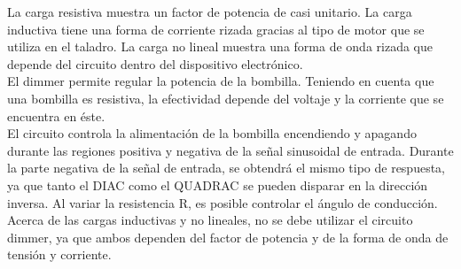 \documentclass[journal]{IEEEtran}
\begin{document}





La carga resistiva muestra un factor de potencia de 
casi unitario. La carga inductiva tiene una forma de 
corriente rizada gracias al tipo de motor que se 
utiliza en el taladro. La carga no lineal muestra 
una forma de onda rizada que depende del circuito 
dentro del dispositivo electrónico. \\

El dimmer permite regular la potencia de la bombilla. 
Teniendo en cuenta que una bombilla es resistiva, la 
efectividad depende del voltaje y la corriente que se 
encuentra en éste. \\

El circuito controla la alimentación de la bombilla 
encendiendo y apagando durante las regiones positiva y 
negativa de la señal sinusoidal de entrada. Durante 
la parte negativa de la señal de entrada, se obtendrá 
el mismo tipo de respuesta, ya que tanto el DIAC como 
el QUADRAC se pueden disparar en la dirección inversa. 
Al variar la resistencia R, es posible controlar el
ángulo de conducción.\\

Acerca de las cargas inductivas y no lineales, no se 
debe utilizar el circuito dimmer, ya que ambos dependen 
del factor de potencia y de la forma de onda de tensión 
y corriente. \\
\end{document}
